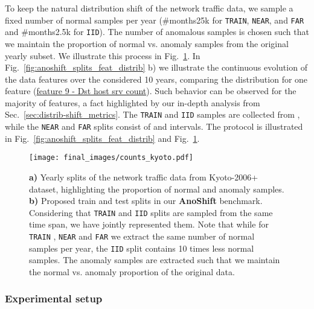 \documentclass{article}
\begin{document}
    To keep the natural distribution shift of the network traffic data, we sample a fixed number of normal samples per year (\#months25k for \texttt{TRAIN}, \texttt{NEAR}, and \texttt{FAR} and \#months2.5k for \texttt{IID}). The number of anomalous samples is chosen such that we maintain the proportion of normal vs. anomaly samples from the original yearly subset. We illustrate this process in Fig.~\ref{fig:anoshift_n_samples}. In Fig.~\ref{fig:anoshift_splits_feat_distrib} b) we illustrate the continuous evolution of the data features over the considered 10 years, comparing the distribution for one feature (\href{http://www.takakura.com/Kyoto_data/BenchmarkData-Description-New.pdf}{feature 9 - Dst host srv count}). Such behavior can be observed for the majority of features, a fact highlighted by our in-depth analysis from Sec.~\ref{sec:distrib-shift_metrics}. The \texttt{TRAIN} and \texttt{IID} samples are collected from , while the \texttt{NEAR} and \texttt{FAR} splits consist of  and  intervals. The protocol is illustrated in Fig.~\ref{fig:anoshift_splits_feat_distrib} and Fig.~\ref{fig:anoshift_n_samples}.
    




    


    
\begin{figure}[t]
    \begin{center}
        \texttt{[image: final\_images/counts\_kyoto.pdf]}
    \end{center}
    \caption{\textbf{a)} Yearly splits of the network traffic data from Kyoto-2006+ dataset, highlighting the proportion of normal and anomaly samples. \textbf{b)} Proposed train and test splits in our \textbf{AnoShift} benchmark. Considering that \texttt{TRAIN} and \texttt{IID} splits are sampled from the same time span, we have jointly represented them. Note that while for \texttt{TRAIN} , \texttt{NEAR} and \texttt{FAR} we extract the same number of normal samples per year, the \texttt{IID} split contains 10 times less normal samples. The anomaly samples are extracted such that we maintain the normal vs. anomaly proportion of the original data.}
    \label{fig:anoshift_n_samples}
\end{figure}
    
    \subsubsection{Experimental setup}
    \label{sec:exp_setup}
    
\end{document}
